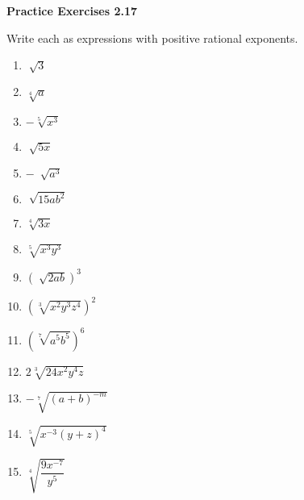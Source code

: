 \vspace{1ex}
\noindent\textbf{Practice Exercises 2.17}

\vspace{0.75ex}

Write each as expressions with positive rational exponents.

\begin{multicols}{3}
\begin{enumerate}[noitemsep, label = \color{blue}\arabic*. ]
\item $\sqrt[]{3}$
\item $\sqrt[{\scriptstyle 4}]{a}$
\item $-\sqrt[{\scriptstyle 5}]{x^{3}}$
\item $\sqrt[]{5x}$
\item $-~\sqrt[]{a^{3}}$
\item $\sqrt[]{15a b^{2}}$
\item $\sqrt[{\scriptstyle 4}]{3x}$
\item $\sqrt[{\scriptstyle 5}]{x^{3}y^{3}}$
\item $\left( \sqrt[]{2ab} \right)^{3}$
\item $\left( \sqrt[{\scriptstyle 3}]{x^{2}y^{3}z^{4}} \right)^{2}$
\item $\left( \sqrt[{\scriptstyle 7}]{a^{5}b^{5}} \right)^{6}$
\item $ 2 \sqrt[{\scriptstyle 3}]{24 x^{2}y^{4}z} $
\item $ -\sqrt[{\scriptstyle 7}]{\left( a+b \right)^{-m}} $
\item $ \sqrt[{\scriptstyle 5}]{x^{-3} (y+z)^{4}} $
\item $ \sqrt[{\scriptstyle 4}]{\dfrac{9 x^{-7}}{y^{5}}} $  
\end{enumerate}
\end{multicols}
